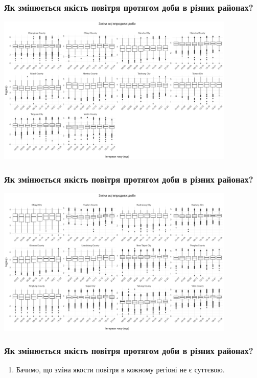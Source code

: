 \documentclass{beamer}
\begin{document}
\begin{frame}
  \frametitle{Як змінюється якість повітря протягом доби в різних районах?}

  \begin{center}
    \includegraphics[height=2.8in]{plots/question3/county-box-p1.png}
  \end{center}
\end{frame}

\begin{frame}
  \frametitle{Як змінюється якість повітря протягом доби в різних районах?}

  \begin{center}
    \includegraphics[height=2.8in]{plots/question3/county-box-p2.png}
  \end{center}
\end{frame}

\begin{frame}
  \frametitle{Як змінюється якість повітря протягом доби в різних районах?}

  \begin{enumerate}
    \item Бачимо, що зміна якости повітря в кожному регіоні не є суттєвою.
  \end{enumerate}
\end{frame}
\end{document}
